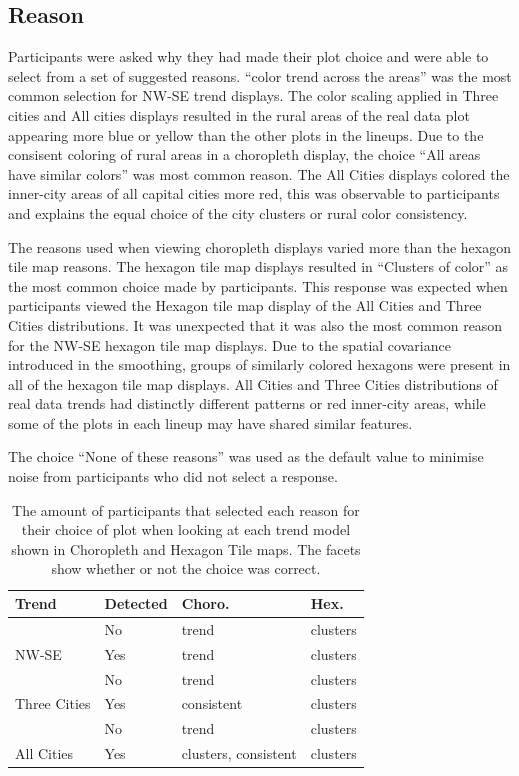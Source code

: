 \documentclass[conference,final,]{IEEEtran}
\begin{document}
\hypertarget{reason}{%
\subsection{Reason}\label{reason}}

Participants were asked why they had made their plot choice and were able to select from a set of suggested reasons.
``color trend across the areas'' was the most common selection for NW-SE trend displays.
The color scaling applied in Three cities and All cities displays resulted in the rural areas of the real data plot appearing more blue or yellow than the other plots in the lineups.
Due to the consisent coloring of rural areas in a choropleth display, the choice ``All areas have similar colors'' was most common reason. The All Cities displays colored the inner-city areas of all capital cities more red, this was observable to participants and explains the equal choice of the city clusters or rural color consistency.

The reasons used when viewing choropleth displays varied more than the hexagon tile map reasons.
The hexagon tile map displays resulted in ``Clusters of color'' as the most common choice made by participants.
This response was expected when participants viewed the Hexagon tile map display of the All Cities and Three Cities distributions. It was unexpected that it was also the most common reason for the NW-SE hexagon tile map displays.
Due to the spatial covariance introduced in the smoothing, groups of similarly colored hexagons were present in all of the hexagon tile map displays. All Cities and Three Cities distributions of real data trends had distinctly different patterns or red inner-city areas, while some of the plots in each lineup may have shared similar features.

The choice ``None of these reasons'' was used as the default value to minimise noise from participants who did not select a response.

\begin{table}

\caption{\label{tab:reason}The amount of participants that selected each reason for their choice of plot when looking at each trend model shown in Choropleth and Hexagon Tile maps. The facets show whether or not the choice was correct.}
\centering
\begin{tabular}[t]{llll}
\toprule
Trend & Detected & Choro. & Hex.\\
\midrule
 & No & trend & clusters\\
\cmidrule{2-4}
\multirow{-2}{*}{\raggedright\arraybackslash NW-SE} & Yes & trend & clusters\\
\cmidrule{1-4}
 & No & trend & clusters\\
\cmidrule{2-4}
\multirow{-2}{*}{\raggedright\arraybackslash Three Cities} & Yes & consistent & clusters\\
\cmidrule{1-4}
 & No & trend & clusters\\
\cmidrule{2-4}
\multirow{-2}{*}{\raggedright\arraybackslash All Cities} & Yes & clusters, consistent & clusters\\
\bottomrule
\end{tabular}
\end{table}
\end{document}
